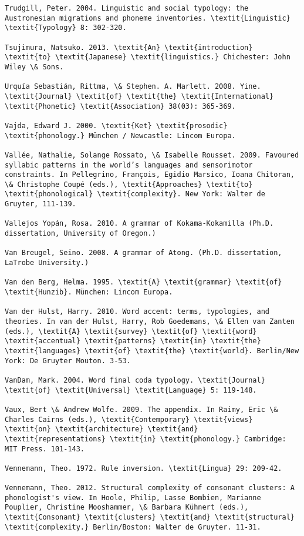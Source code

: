 \begin{verbatim}
Trudgill, Peter. 2004. Linguistic and social typology: the Austronesian migrations and phoneme inventories. \textit{Linguistic} \textit{Typology} 8: 302-320.

Tsujimura, Natsuko. 2013. \textit{An} \textit{introduction} \textit{to} \textit{Japanese} \textit{linguistics.} Chichester: John Wiley \& Sons.

Urquía Sebastián, Rittma, \& Stephen. A. Marlett. 2008. Yine. \textit{Journal} \textit{of} \textit{the} \textit{International} \textit{Phonetic} \textit{Association} 38(03): 365-369.

Vajda, Edward J. 2000. \textit{Ket} \textit{prosodic} \textit{phonology.} München / Newcastle: Lincom Europa.

Vallée, Nathalie, Solange Rossato, \& Isabelle Rousset. 2009. Favoured syllabic patterns in the world’s languages and sensorimotor constraints. In Pellegrino, François, Egidio Marsico, Ioana Chitoran, \& Christophe Coupé (eds.), \textit{Approaches} \textit{to} \textit{phonological} \textit{complexity}. New York: Walter de Gruyter, 111-139.

Vallejos Yopán, Rosa. 2010. A grammar of Kokama-Kokamilla (Ph.D. dissertation, University of Oregon.)

Van Breugel, Seino. 2008. A grammar of Atong. (Ph.D. dissertation, LaTrobe University.)

Van den Berg, Helma. 1995. \textit{A} \textit{grammar} \textit{of} \textit{Hunzib}. München: Lincom Europa.

Van der Hulst, Harry. 2010. Word accent: terms, typologies, and theories. In van der Hulst, Harry, Rob Goedemans, \& Ellen van Zanten (eds.), \textit{A} \textit{survey} \textit{of} \textit{word} \textit{accentual} \textit{patterns} \textit{in} \textit{the} \textit{languages} \textit{of} \textit{the} \textit{world}. Berlin/New York: De Gruyter Mouton. 3-53.

VanDam, Mark. 2004. Word final coda typology. \textit{Journal} \textit{of} \textit{Universal} \textit{Language} 5: 119-148.

Vaux, Bert \& Andrew Wolfe. 2009. The appendix. In Raimy, Eric \& Charles Cairns (eds.), \textit{Contemporary} \textit{views} \textit{on} \textit{architecture} \textit{and} \textit{representations} \textit{in} \textit{phonology.} Cambridge: MIT Press. 101-143.

Vennemann, Theo. 1972. Rule inversion. \textit{Lingua} 29: 209-42.

Vennemann, Theo. 2012. Structural complexity of consonant clusters: A phonologist's view. In Hoole, Philip, Lasse Bombien, Marianne Pouplier, Christine Mooshammer, \& Barbara Kühnert (eds.), \textit{Consonant} \textit{clusters} \textit{and} \textit{structural} \textit{complexity.} Berlin/Boston: Walter de Gruyter. 11-31.


\end{verbatim}
